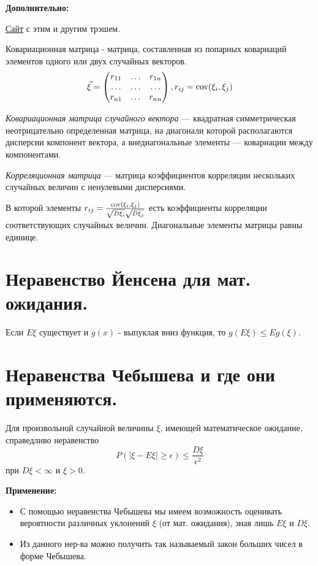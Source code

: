 \noindent \textbf{Дополнительно:}

\href{http://www.machinelearning.ru/wiki/index.php?title=%D0%9A%D0%BE%D0%B2%D0%B0%D1%80%D0%B8%D0%B0%D1%86%D0%B8%D0%BE%D0%BD%D0%BD%D0%B0%D1%8F_%D0%BC%D0%B0%D1%82%D1%80%D0%B8%D1%86%D0%B0}{Сайт} с этим и другим трэшем.

Ковариационная матрица - матрица, составленная из попарных ковариаций элементов одного или двух случайных векторов.
\[
\vec{\xi} =
\begin{pmatrix}
	r_{11} & \dots & r_{1n} \\
	\dots  & \dots & \dots \\
	r_{n1} & \dots & r_{nn}
\end{pmatrix},
r_{ij} = \operatorname{\mathop{cov}} (\xi_i, \xi_j)
\]

\textit{Ковариационная матрица случайного вектора} — квадратная симметрическая неотрицательно определенная матрица, на диагонали которой располагаются дисперсии компонент вектора, а внедиагональные элементы — ковариации между компонентами.

\textit{Корреляционная матрица} — матрица коэффициентов корреляции нескольких случайных величин с ненулевыми дисперсиями.

\noindent В которой элементы $r_{ij} = \frac{\operatorname{\mathop{cov}} (\xi_i, \xi_j)}{\sqrt{D\xi_i} \sqrt{D\xi_j}}$ есть коэффициенты корреляции соответствующих случайных величин. Диагональные элементы матрицы равны единице.

\section{Неравенство Йенсена для мат. ожидания.}

Если $E\xi$ существует и $g(x)$ - выпуклая вниз функция, то $g(E\xi) \le E g(\xi)$.

\section{Неравенства Чебышева и где они применяются.}

Для произвольной случайной величины $\xi$, имеющей математическое ожидание, справедливо неравенство
\[ P( |\xi - E\xi| \ge \epsilon ) \le \frac{D\xi}{\epsilon^2} \]
при $D\xi < \infty$ и $\xi > 0$.

\noindent \textbf{Применение:}

\begin{itemize}
	\item С помощью неравенства Чебышева мы имеем возможность оценивать вероятности различных уклонений $\xi$ (от мат. ожидания), зная лишь $E\xi$ и $D\xi$.
	\item Из данного нер-ва можно получить так называемый закон больших чисел в форме Чебышева.
\end{itemize}

